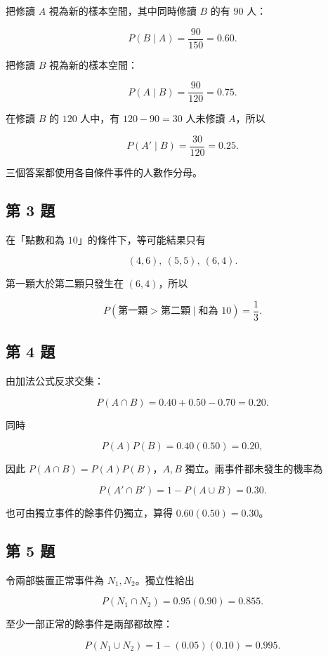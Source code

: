 \documentclass[11pt,a4paper]{article}
\begin{document}
把修讀 \(A\) 視為新的樣本空間，其中同時修讀 \(B\) 的有 \(90\) 人：

\[
P(B\mid A)=\frac{90}{150}=\boxed{0.60}.
\]

把修讀 \(B\) 視為新的樣本空間：

\[
P(A\mid B)=\frac{90}{120}=\boxed{0.75}.
\]

在修讀 \(B\) 的 \(120\) 人中，有 \(120-90=30\) 人未修讀 \(A\)，所以

\[
P(A'\mid B)=\frac{30}{120}=\boxed{0.25}.
\]

三個答案都使用各自條件事件的人數作分母。

\subsection{第 3 題}\label{ux7b2c-3-ux984c}

在「點數和為 \(10\)」的條件下，等可能結果只有

\[
(4,6),\ (5,5),\ (6,4).
\]

第一顆大於第二顆只發生在 \((6,4)\)，所以

\[
P(\text{第一顆}>\text{第二顆}\mid\text{和為 }10)
=\boxed{\frac13}.
\]

\subsection{第 4 題}\label{ux7b2c-4-ux984c}

由加法公式反求交集：

\[
P(A\cap B)=0.40+0.50-0.70=0.20.
\]

同時

\[
P(A)P(B)=0.40(0.50)=0.20,
\]

因此 \(P(A\cap B)=P(A)P(B)\)，\(A,B\) 獨立。兩事件都未發生的機率為

\[
P(A'\cap B')=1-P(A\cup B)=\boxed{0.30}.
\]

也可由獨立事件的餘事件仍獨立，算得 \(0.60(0.50)=0.30\)。

\subsection{第 5 題}\label{ux7b2c-5-ux984c}

令兩部裝置正常事件為 \(N_1,N_2\)。獨立性給出

\[
P(N_1\cap N_2)=0.95(0.90)=\boxed{0.855}.
\]

至少一部正常的餘事件是兩部都故障：

\[
P(N_1\cup N_2)=1-(0.05)(0.10)=\boxed{0.995}.
\]
\end{document}
